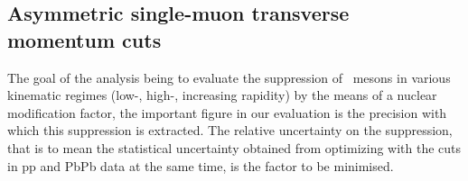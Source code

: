 \subsection{Asymmetric single-muon transverse momentum cuts}


The goal of the analysis being to evaluate the
suppression of \PgU\ mesons in various kinematic regimes (low-\pt,
high-\pt, increasing rapidity) by the means of a nuclear modification
factor, the important figure in our evaluation is the precision with
which this suppression is extracted. The relative uncertainty on the
suppression, that is to mean the statistical uncertainty obtained from
optimizing with the cuts in pp and PbPb data at the same time, is the
factor to be minimised.




